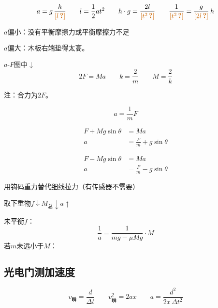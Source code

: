 
\[
a=g\,\frac{h}{\unclear{l}}\qquad l=\frac{1}{2}at^2\qquad h\cdot g=\frac{2l}{\unclear{t^2}}\qquad \frac{1}{\unclear{t^2}}=\frac{g}{\unclear{2l}}\,h
\]

$a$偏小：没有平衡摩擦力或平衡摩擦力不足

$a$偏大：木板右端垫得太高。


$a$-$F$图中$\downarrow$
\[2F=Ma\qquad k=\frac{2}{m}\qquad M=\frac{2}{k}\] %

注：合力为$2F$。

\[a=\frac{1}{m}F\]

\begin{align*}
F+Mg\sin\theta&=Ma\\
a&=\frac{F}{m}+g\sin\theta %
\end{align*}

\begin{align*}
F-Mg\sin\theta&=Ma\\
a&=\frac{F}{m}-g\sin\theta %
\end{align*}

用钩码重力替代细线拉力（有传感器不需要）

取下重物\quad $f\downarrow$\quad $M_{\text{总}}\downarrow$\quad $a\uparrow$

未平衡$f$：
\[
\frac{1}{a}=\frac{1}{mg-\mu Mg}\cdot M
\]
若$m$未远小于$M$：

\subsection{光电门测加速度}

\[
v_{\text{瞬}}=\frac{d}{\Delta t}\qquad v_{\text{瞬}}^2=2ax\qquad a=\frac{d^2}{2x\,\Delta t^2}
\]

